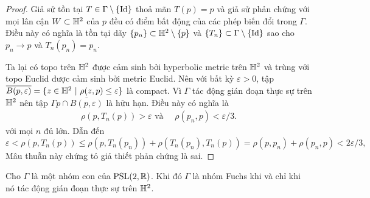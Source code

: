 \begin{proof}

    Giả sử tồn tại $T \in \Gamma\setminus\{\operatorname{Id}\}$ thoả mãn $T(p) = p$ và giả sử phản chứng với mọi lân cận $W \subset \mathbb{H}^2$ của $p$ đều có điểm bất động của các phép biến đổi trong $\Gamma$. Điều này có nghĩa là tồn tại dãy $\{p_n\} \subset \mathbb{H}^2 \setminus\{p\}$ và $\{T_n\} \subset \Gamma\setminus\{\operatorname{Id}\}$ sao cho $p_n \to p$ và $T_n(p_n) = p_n$.

    Ta lại có topo trên $\mathbb{H}^2$ được cảm sinh bởi hyperbolic metric trên $\mathbb{H}^2$ và trùng với topo Euclid được cảm sinh bởi metric Euclid. Nên với bất kỳ $\varepsilon >0$, tập $\overline{B(p, \varepsilon)} = \{z \in \mathbb{H}^2~|~\rho(z,p) \leq \varepsilon\}$ là compact. Vì $\Gamma$ tác động gián đoạn thực sự trên $\mathbb{H}^2$ nên tập $\Gamma p \cap \overline{B(p, \varepsilon)}$ là hữu hạn. Điều này có nghĩa là 
    \begin{align*}
        \rho(p, T_n(p)) > \varepsilon \text{ và }\quad \rho(p_n, p) < \varepsilon/3.
    \end{align*}
    với mọi $n$ đủ lớn.
    Dẫn đến
    \[\varepsilon < \rho(p, T_n(p)) \leq \rho(p, T_n(p_n)) + \rho(T_n(p_n), T_n(p)) = \rho(p, p_n) + \rho(p_n,p)< 2\varepsilon/3, \]
    Mâu thuẫn này chứng tỏ giả thiết phản chứng là sai.
\end{proof}
\begin{thm}\label{thm 3.2.18}
    Cho $\Gamma$ là một nhóm con của $\operatorname{PSL}(2,\mathbb{R})$. Khi đó $\Gamma$ là nhóm Fuchs khi và chỉ khi nó tác động gián đoạn thực sự trên $\mathbb{H}^2$.
\end{thm}
